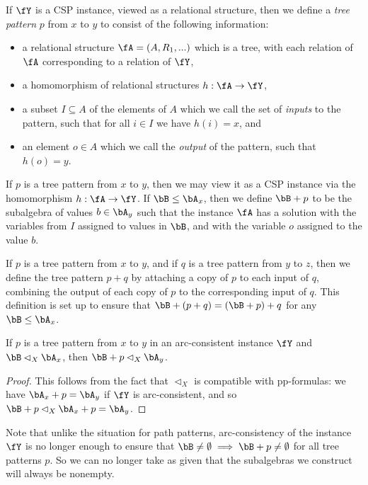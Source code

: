 \begin{defn} If $\fY$ is a CSP instance, viewed as a relational structure, then we define a \emph{tree pattern} $p$ from $x$ to $y$ to consist of the following information:
\begin{itemize}
\item a relational structure $\fA = (A,R_1, ...)$ which is a tree, with each relation of $\fA$ corresponding to a relation of $\fY$,
\item a homomorphism of relational structures $h : \fA \rightarrow \fY$,
\item a subset $I \subseteq A$ of the elements of $A$ which we call the set of \emph{inputs} to the pattern, such that for all $i \in I$ we have $h(i) = x$, and
\item an element $o \in A$ which we call the \emph{output} of the pattern, such that $h(o) = y$.
\end{itemize}
If $p$ is a tree pattern from $x$ to $y$, then we may view it as a CSP instance via the homomorphism $h : \fA \rightarrow \fY$. If $\bB \le \bA_x$, then we define $\bB + p$ to be the subalgebra of values $b \in \bA_y$ such that the instance $\fA$ has a solution with the variables from $I$ assigned to values in $\bB$, and with the variable $o$ assigned to the value $b$.

If $p$ is a tree pattern from $x$ to $y$, and if $q$ is a tree pattern from $y$ to $z$, then we define the tree pattern $p+q$ by attaching a copy of $p$ to each input of $q$, combining the output of each copy of $p$ to the corresponding input of $q$. This definition is set up to ensure that $\bB+(p+q) = (\bB+p)+q$ for any $\bB \le \bA_x$.
\end{defn}

\begin{prop} If $p$ is a tree pattern from $x$ to $y$ in an arc-consistent instance $\fY$ and $\bB \lhd_X \bA_x$, then $\bB + p \lhd_X \bA_y$.
\end{prop}
\begin{proof} This follows from the fact that $\lhd_X$ is compatible with pp-formulas: we have $\bA_x + p = \bA_y$ if $\fY$ is arc-consistent, and so $\bB+p \lhd_X \bA_x+p = \bA_y$.
\end{proof}

Note that unlike the situation for path patterns, arc-consistency of the instance $\fY$ is no longer enough to ensure that $\bB \ne \emptyset \implies \bB+p \ne \emptyset$ for all tree patterns $p$. So we can no longer take as given that the subalgebras we construct will always be nonempty.

